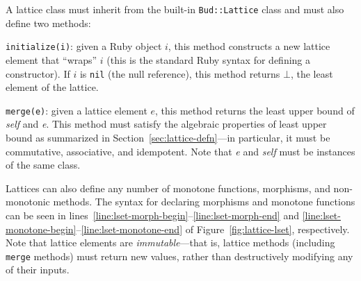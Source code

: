 A lattice class must inherit from the built-in \texttt{Bud::Lattice} class and
must also define two methods:
\begin{compactitem}
\item \texttt{initialize(i)}: given a Ruby object $i$, this method constructs a
  new lattice element that ``wraps'' $i$ (this is the standard Ruby syntax for
  defining a constructor). If $i$ is \texttt{nil} (the null reference), this
  method returns $\bot$, the least element of the lattice.

\item \texttt{merge(e)}: given a lattice element $e$, this method returns the
  least upper bound of \emph{self} and \emph{e}. This method must satisfy the
  algebraic properties of least upper bound as summarized in
  Section~\ref{sec:lattice-defn}---in particular, it must be commutative,
  associative, and idempotent. Note that \emph{e} and \emph{self} must be
  instances of the same class.
\end{compactitem}
Lattices can also define any number of monotone functions, morphisms, and
non-monotonic methods. The syntax for declaring morphisms and monotone functions
can be seen in lines~\ref{line:lset-morph-begin}--\ref{line:lset-morph-end} and
\ref{line:lset-monotone-begin}--\ref{line:lset-monotone-end} of
Figure~\ref{fig:lattice-lset}, respectively. Note that lattice elements are
\emph{immutable}---that is, lattice methods (including \texttt{merge} methods)
must return new values, rather than destructively modifying any of their inputs.




